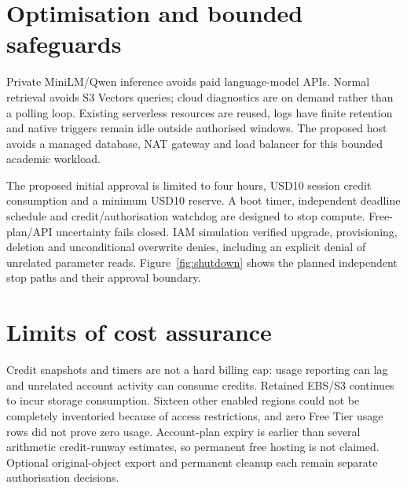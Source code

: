 \section{Optimisation and bounded safeguards}
Private MiniLM/Qwen inference avoids paid language-model APIs. Normal retrieval avoids S3 Vectors queries; cloud diagnostics are on demand rather than a polling loop. Existing serverless resources are reused, logs have finite retention and native triggers remain idle outside authorised windows. The proposed host avoids a managed database, NAT gateway and load balancer for this bounded academic workload.

The proposed initial approval is limited to four hours, USD10 session credit consumption and a minimum USD10 reserve. A boot timer, independent deadline schedule and credit/authorisation watchdog are designed to stop compute. Free-plan/API uncertainty fails closed. IAM simulation verified upgrade, provisioning, deletion and unconditional overwrite denies, including an explicit denial of unrelated parameter reads.
Figure~\ref{fig:shutdown} shows the planned independent stop paths and their approval boundary.
{\setlength{\intextsep}{5pt}\setlength{\textfloatsep}{6pt}
}
\section{Limits of cost assurance}
Credit snapshots and timers are not a hard billing cap: usage reporting can lag and unrelated account activity can consume credits. Retained EBS/S3 continues to incur storage consumption. Sixteen other enabled regions could not be completely inventoried because of access restrictions, and zero Free Tier usage rows did not prove zero usage. Account-plan expiry is earlier than several arithmetic credit-runway estimates, so permanent free hosting is not claimed. Optional original-object export and permanent cleanup each remain separate authorisation decisions.
\FloatBarrier
